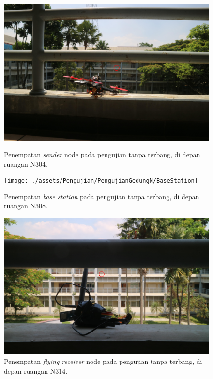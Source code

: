 \begin{figure}[H]
	\centering
	\includegraphics[scale=0.04]{./assets/Pengujian/PengujianGedungN/SenderNode}
	\caption{Penempatan \textit{sender} node pada pengujian tanpa terbang, di depan ruangan N304.}
	
	\texttt{[image: ./assets/Pengujian/PengujianGedungN/BaseStation]}
	\caption{Penempatan \textit{base station} pada pengujian tanpa terbang, di depan ruangan N308.}
	
	\includegraphics[scale=0.04]{./assets/Pengujian/PengujianGedungN/FlyingReceiverNode}
	\caption{Penempatan \textit{flying receiver} node pada pengujian tanpa terbang, di depan ruangan N314.}
\end{figure}


